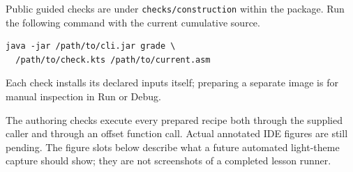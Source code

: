 Public guided checks are under \texttt{checks/construction} within the package. Run
the following command with the current cumulative source.
\begin{verbatim}
java -jar /path/to/cli.jar grade \
  /path/to/check.kts /path/to/current.asm
\end{verbatim}
Each check installs its declared inputs itself;
preparing a separate image is for manual inspection in Run or Debug.

The authoring checks execute every prepared recipe both through the supplied
caller and through an offset function call. Actual annotated IDE figures are still
pending. The figure slots below describe what a future automated light-theme capture
should show; they are not screenshots of a completed lesson runner.
